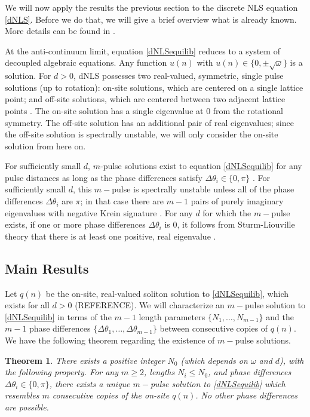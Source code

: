 \documentclass[12pt]{article}
\newtheorem{theorem}{Theorem}
\begin{document}
We will now apply the results the previous section to the discrete NLS equation \eqref{dNLS}. Before we do that, we will give a brief overview what is already known. More details can be found in \cite{Kevrekidis2009}. 

At the anti-continuum limit, equation \eqref{dNLSequilib} reduces to a system of decoupled algebraic equations. Any function $u(n)$ with $u(n) \in \{ 0, \pm \sqrt{\omega}\}$ is a solution. For $d > 0$, dNLS possesses two real-valued, symmetric, single pulse solutions (up to rotation): on-site solutions, which are centered on a single lattice point; and off-site solutions, which are centered between two adjacent lattice points \cite{Kevrekidis2009}. The on-site solution has a single eigenvalue at 0 from the rotational symmetry. The off-site solution has an additional pair of real eigenvalues; since the off-site solution is spectrally unstable, we will only consider the on-site solution from here on. 

For sufficiently small $d$, $m$-pulse solutions exist to equation \eqref{dNLSequilib} for any pulse distances as long as the phase differences satisfy $\Delta \theta_i \in \{0, \pi\}$ \cite[Proposition 2.1]{Pelinovsky2005}. For sufficiently small $d$, this $m-$pulse is spectrally unstable unless all of the phase differences $\Delta \theta_i$ are $\pi$; in that case there are $m-1$ pairs of purely imaginary eigenvalues with negative Krein signature \cite[Theorem 3.6]{Pelinovsky2005}. For any $d$ for which the $m-$pulse exists, if one or more phase differences $\Delta \theta_i$ is 0, it follows from Sturm-Liouville theory that there is at least one positive, real eigenvalue \cite{Kapitula2001a}.

\subsection{Main Results}

Let $q(n)$ be the on-site, real-valued soliton solution to \eqref{dNLSequilib}, which exists for all $d > 0$ (REFERENCE). We will characterize an $m-$pulse solution to \eqref{dNLSequilib} in terms of the $m-1$ length parameters $\{ N_1, \dots, N_{m-1} \}$ and the $m-1$ phase differences $\{ \Delta\theta_1, \dots, \Delta\theta_{m-1} \}$ between consecutive copies of $q(n)$. We have the following theorem regarding the existence of $m-$pulse solutions.

\begin{theorem}\label{dNLSexisttheorem}
There exists a positive integer $N_0$ (which depends on $\omega$ and $d$), with the following property. For any $m \geq 2$, lengths $N_i \leq N_0$, and phase differences $\Delta\theta_i \in \{0, \pi\}$, there exists a unique $m-$pulse solution to \eqref{dNLSequilib} which resembles $m$ consecutive copies of the on-site $q(n)$. No other phase differences are possible.
\end{theorem}
\end{document}
